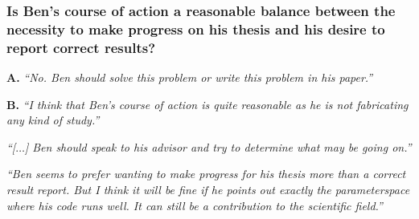 \documentclass[12pt]{beamer}
\newcommand\ans[1]{{\it ``#1''}}
\newcommand\gap{\vspace{5mm}}
\begin{document}
\begin{frame} %
  \frametitle{ Is Ben's course of action a reasonable balance between the necessity to make progress on his thesis and his desire to report correct results? }

{\bf A. }   \ans{No.  Ben should solve this problem or write this problem in his paper.}

  \gap

{\bf B. }   \ans{I  think  that  Ben’s  course  of  action  is  quite  reasonable  as  he  is  not  fabricating  any kind of study.}
    
\end{frame}

\begin{frame}

  \ans{[$\dots$] Ben should speak to his advisor and try to determine what may be going on.}

  \gap
  
  \ans{Ben  seems  to  prefer  wanting  to  make  progress  for  his  thesis  more  than  a correct result report.  But I think it will be fine if he points out exactly the parameterspace where his code runs well.  It can still be a contribution to the scientific field.}

  







\end{frame}
\end{document}
